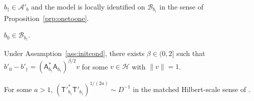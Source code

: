 %


\begin{assumption}\label{ass:identif}
$b_\dagger \in \mathcal{A}'_b$ and the model is locally identified on
$\mathcal{B}_{b_\dagger}$ in the sense of Proposition~\ref{prp:onetoone}.
\end{assumption}

\begin{assumption}\label{ass:initcond}
$b_0 \in \mathcal{B}_{b_\dagger}$.
\end{assumption}

\begin{assumption}\label{ass:sourcecond}
Under Assumption~\ref{ass:initcond}, there exists $\beta \in (0, 2]$ such that
$b'_0 - b'_\dagger = (\mathsf{A}^*_{b_\dagger}\mathsf{A}_{b_\dagger})^{\beta/2} v$
for some $v \in \mathcal{H}$ with $\|v\| = 1$.
\end{assumption}

\begin{assumption}\label{ass:linkcond}
For some $a > 1$, $(\mathsf{T}'^{*}_{b_\dagger}\mathsf{T}'_{b_\dagger})^{1/(2a)}
\sim D^{-1}$ in the matched Hilbert-scale sense of \citet{florens2012}.
\end{assumption}

